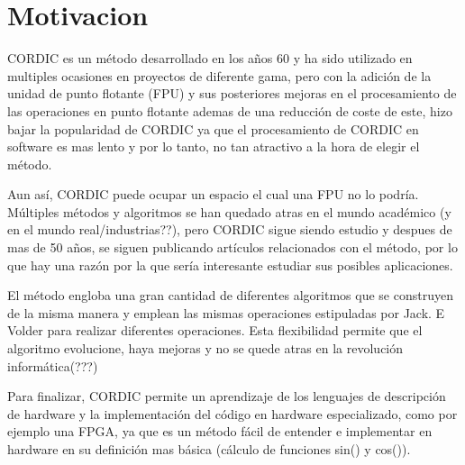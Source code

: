 \chapter{Motivacion}
\label{motivacion}

CORDIC es un método desarrollado en los años 60 y ha sido utilizado en multiples ocasiones en proyectos de diferente gama, pero con la adición de la unidad de punto flotante (FPU) y sus posteriores mejoras en el procesamiento de las operaciones en punto flotante ademas de una reducción de coste de este, hizo bajar la popularidad de CORDIC ya que el procesamiento de CORDIC en software es mas lento y por lo tanto, no tan atractivo a la hora de elegir el método.

Aun así, CORDIC puede ocupar un espacio el cual una FPU no lo podría. Múltiples métodos y algoritmos se han quedado atras en el mundo académico (y en el mundo real/industrias??), pero CORDIC sigue siendo estudio y despues de mas de 50 años, se siguen publicando artículos relacionados con el método, por lo que hay una razón por la que sería interesante estudiar sus posibles aplicaciones.

El método engloba una gran cantidad de diferentes algoritmos que se construyen de la misma manera y emplean las mismas operaciones estipuladas por Jack. E Volder para realizar diferentes operaciones. Esta flexibilidad permite que el algoritmo evolucione, haya mejoras y no se quede atras en la revolución informática(???)

Para finalizar, CORDIC permite un aprendizaje de los lenguajes de descripción de hardware y la implementación del código en hardware especializado, como por ejemplo una FPGA, ya que es un método fácil de entender e implementar en hardware en su definición mas básica (cálculo de funciones sin() y cos()).
